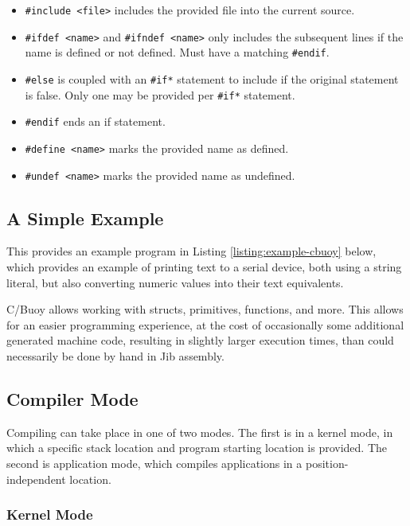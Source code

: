 \documentclass{article}
\begin{document}
\begin{itemize}
	\item \texttt{\#include <file>} includes the provided file into the current source.
	\item \texttt{\#ifdef <name>} and \texttt{\#ifndef <name>} only includes the subsequent lines if the name is defined or not defined. Must have a matching \texttt{\#endif}.
	\item \texttt{\#else} is coupled with an \texttt{\#if*} statement to include if the original statement is false. Only one may be provided per \texttt{\#if*} statement.
	\item \texttt{\#endif} ends an if statement.
	\item \texttt{\#define <name>} marks the provided name as defined.
	\item \texttt{\#undef <name>} marks the provided name as undefined.
\end{itemize}

\subsection{A Simple Example}

This provides an example program in Listing \ref{listing:example-cbuoy} below, which provides an example of printing text to a serial device, both using a string literal, but also converting numeric values into their text equivalents.



C/Buoy allows working with structs, primitives, functions, and more. This allows for an easier programming experience, at the cost of occasionally some additional generated machine code, resulting in slightly larger execution times, than could necessarily be done by hand in Jib assembly.

\subsection{Compiler Mode}

Compiling can take place in one of two modes. The first is in a kernel mode, in which a specific stack location and program starting location is provided. The second is application mode, which compiles applications in a position-independent location.

\subsubsection{Kernel Mode}
\end{document}
